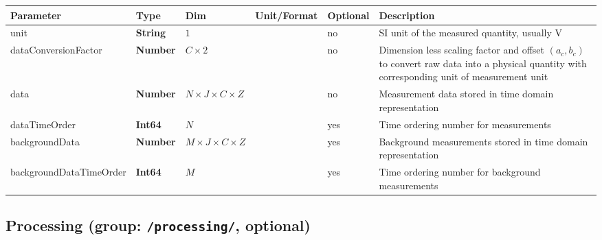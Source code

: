\documentclass[landscape,a4paper]{article} %
\newcommand{\inl}[1]{\lstinline[columns=fixed]{#1}}
\newcommand{\inltab}[1]{{\ttfamily\bfseries\color{blue}#1}}
\newcommand{\inlvar}[1]{{\ttfamily#1}}
\begin{document}
\noindent \begin{tabularx}{\columnwidth}{llp{3cm}llX} 
\textbf{Parameter} & \textbf{Type} & \textbf{Dim} & \textbf{Unit/Format} & \textbf{Optional} & \textbf{Description} \\ \hline 
\inlvar{unit} & \inltab{String} & $1$ & & no & SI unit of the measured quantity, usually V \\ \hline 
\inlvar{dataConversionFactor} & \inltab{Number} & $C \times 2$ & & no & Dimension less scaling factor and offset $(a_c, b_c)$ to convert raw data into a physical quantity with corresponding unit of measurement \inlvar{unit} \\ \hline 
\inlvar{data} & \inltab{Number} & $N \times J \times C \times Z$ & & no & Measurement data stored in time domain representation \\ \hline 
\inlvar{dataTimeOrder} & \inltab{Int64} & $N$ & & yes & Time ordering number for measurements \\ \hline	
\inlvar{backgroundData} & \inltab{Number} &  $M \times J \times C \times Z$ & & yes & Background measurements stored in time domain representation \\ \hline
 \inlvar{backgroundDataTimeOrder} & \inltab{Int64} & $M$ & & yes & Time ordering number for background measurements \\ \hline
 \end{tabularx}

\subsection{Processing (group: \inl{/processing/}, optional)}
\end{document}
